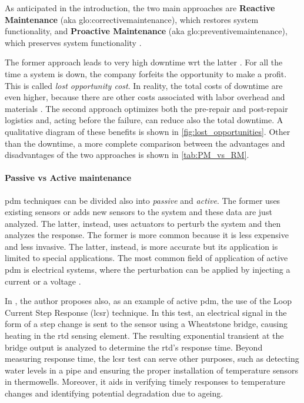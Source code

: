 As anticipated in the introduction, the two main approaches are \textbf{Reactive Maintenance} (\gls{aka} \gls{glo:correctivemaintenance}), which restores system functionality, and \textbf{Proactive Maintenance} (\gls{aka} \gls{glo:preventivemaintenance}), which preserves system functionality \cite{Rely_maint_book}.

The former approach leads to very high downtime \gls{wrt} the latter \cite{NIST}. For all the time a system is down, the company forfeits the opportunity to make a profit. This is called \emph{lost opportunity cost}. In reality, the total costs of downtime are even higher, because there are other costs associated with labor overhead and materials \cite{Lost_Opport_Cost}. The second approach optimizes both the pre-repair and post-repair logistics and, acting before the failure, can reduce also the total downtime. A qualitative diagram of these benefits is shown in \autoref{fig:lost_opportunities}. Other than the downtime, a more complete comparison between the advantages and disadvantages of the two approaches is shown in \autoref{tab:PM_vs_RM}.



\paragraph{Passive vs Active maintenance}
\gls{pdm} techniques can be divided also into \emph{passive} and \emph{active}. The former uses existing sensors or adds new sensors to the system and these data are just analyzed. The latter, instead, uses actuators to perturb the system and then analyzes the response. The former is more common because it is less expensive and less invasive. The latter, instead, is more accurate but its application is limited to special applications. The most common field of application of active \gls{pdm} is electrical systems, where the perturbation can be applied by injecting a current or a voltage \cite{State_Art_Hasemian_2011}.

In \cite{State_Art_Hasemian_2011}, the author proposes also, as an example of active \gls{pdm}, the use of the Loop Current Step Response (\gls{lcsr}) technique. In this test, an electrical signal in the form of a step change is sent to the sensor using a Wheatstone bridge, causing heating in the \gls{rtd} sensing element. The resulting exponential transient at the bridge output is analyzed to determine the \gls{rtd}'s response time. Beyond measuring response time, the \gls{lcsr} test can serve other purposes, such as detecting water levels in a pipe and ensuring the proper installation of temperature sensors in thermowells. Moreover, it aids in verifying timely responses to temperature changes and identifying potential degradation due to ageing.

